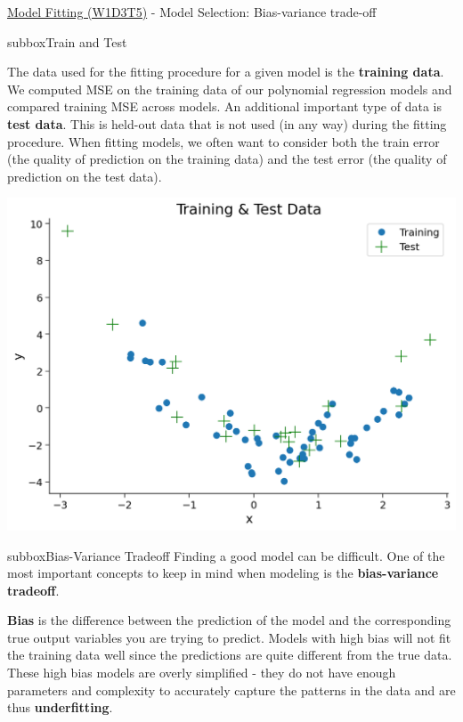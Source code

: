 \begin{textbox}{\href{https://compneuro.neuromatch.io/tutorials/W1D3_ModelFitting/student/W1D3_Tutorial5.html}{Model Fitting (W1D3T5)} -  Model Selection: Bias-variance trade-off}
\begin{subbox}{subbox}{Train and Test}
\scriptsize

 The data used for the fitting procedure for a given model is the \textbf{training data}. We computed MSE on the training data of our polynomial regression models and compared training MSE across models. An additional important type of data is \textbf{test data}. This is held-out data that is not used (in any way) during the fitting procedure. When fitting models, we often want to consider both the train error (the quality of prediction on the training data) and the test error (the quality of prediction on the test data).
 
\centering
\includegraphics[scale=0.2]{Figures/ModelFitting/MFFigure5.png}
\end{subbox}
\begin{subbox}{subbox}{Bias-Variance Tradeoff}
\scriptsize
Finding a good model can be difficult. One of the most important concepts to keep in mind when modeling is the \textbf{bias-variance tradeoff}. 

\textbf{Bias} is the difference between the prediction of the model and the corresponding true output variables you are trying to predict. Models with high bias will not fit the training data well since the predictions are quite different from the true data. These high bias models are overly simplified - they do not have enough parameters and complexity to accurately capture the patterns in the data and are thus \textbf{underfitting}.



\end{subbox}
\end{textbox}
